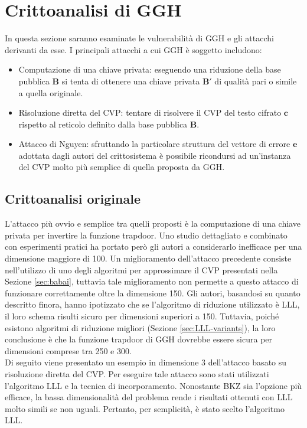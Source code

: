 \section{Crittoanalisi di GGH}
In questa sezione saranno esaminate le vulnerabilità di GGH e gli attacchi derivanti da esse. 
I principali attacchi a cui GGH è soggetto includono:
\begin{itemize}
\item Computazione di una chiave privata: eseguendo una riduzione della base pubblica $\mathbf{B}$
si tenta di ottenere una chiave privata $\mathbf{B}'$ di qualità pari o simile a quella originale. 
\item Risoluzione diretta del CVP: tentare di risolvere il CVP del testo cifrato $\mathbf{c}$ 
rispetto al reticolo definito dalla base pubblica $\mathbf{B}$. 
\item Attacco di Nguyen: sfruttando la particolare struttura del vettore di errore $\mathbf{e}$ 
adottata dagli autori del crittosistema è possibile ricondursi ad un'instanza del CVP molto più 
semplice di quella proposta da GGH. 
\end{itemize}

\subsection{Crittoanalisi originale}
L'attacco più ovvio e semplice tra quelli proposti è la computazione di una chiave privata per invertire la
funzione trapdoor. Uno studio dettagliato e combinato con esperimenti pratici ha portato però 
gli autori a considerarlo inefficace per una dimensione maggiore di 100.
Un miglioramento dell'attacco precedente consiste nell'utilizzo di uno degli algoritmi
per approssimare il CVP presentati nella Sezione \ref{sec:babai}, tuttavia tale miglioramento
non permette a questo attacco di funzionare correttamente oltre la dimensione 150.
Gli autori, basandosi su quanto descritto finora, hanno ipotizzato che se l'algoritmo di 
riduzione utilizzato è LLL, il loro schema risulti sicuro per dimensioni superiori a 150. 
Tuttavia, poiché esistono algoritmi di riduzione migliori (Sezione \ref{sec:LLL-variants}), 
la loro conclusione è che la funzione trapdoor di GGH dovrebbe essere sicura per dimensioni 
comprese tra 250 e 300. \\
Di seguito viene presentato un esempio in dimensione 3 dell'attacco basato su 
risoluzione diretta del CVP. 
Per eseguire tale attacco sono stati utilizzati l'algoritmo LLL e la tecnica di incorporamento. 
Nonostante BKZ sia l'opzione più efficace, la bassa 
dimensionalità del problema rende i risultati ottenuti con LLL molto simili se non uguali. 
Pertanto, per semplicità, è stato scelto l'algoritmo LLL.



